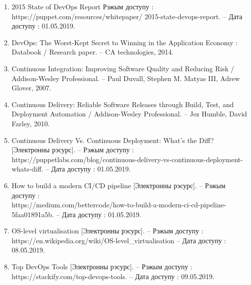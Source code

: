 \begin{enumerate}[{label=\arabic{*}}]
    \item 2015 State of DevOps Report
          Рэжым доступу : https://puppet.com/resources/whitepaper/
          2015-state-devops-report. --
          Дата доступу : 01.05.2019.
        \label{site:puppet.com/resources/whitepaper/2015}

    \item DevOps: The Worst-Kept Secret to Winning
          in the Application Economy : Databook /
          Research paper. --
          CA technologies, 2014.
        \label{article:DevOps:The Worst-Kept Secret}

    \item Continuous Integration:
          Improving Software Quality and Reducing Risk /
          Addison-Wesley Professional. --
          Paul Duvall, Stephen M. Matyas III, Adrew Glover, 2007.
        \label{book:Continuous Integration}

    \item Continuous Delivery: 
          Reliable Software Releases through Build, Test, 
          and Deployment Auto\-mation / 
          Addison-Wesley Professional. -- 
          Jez Humble, David Farley, 2010.
        \label{book:Continuous Delivery}

    \item Continuous Delivery Vs. Continuous Deployment: What's the Diff?
          [Электронны рэсурс].\,\,--
          Рэжым доступу : https://puppetlabs.com/blog/continuous-delivery-vs-continuous-deployment-whats-diff. --
          Дата доступу : 01.05.2019.
        \label{book:Continuous Delivery vs. Continuous Deployment}

    \item How to build a modern CI/CD pipeline
          [Электронны рэсурс]. --
          Рэжым доступу : \\
          https://medium.com/bettercode/how-to-build-a-modern-ci-cd-pipeline-5faa01891a5b. --
          Дата доступу : 01.05.2019.
        \label{site:CI/CD-pipeline}

    \item OS-level virtualisation
          [Электронны рэсурс]. --
          Рэжым доступу : \\
          https://en.wikipedia.org/wiki/OS-level\_virtualisation --
          Дата доступу : 08.05.2019.
        \label{site:OS-level}

    \item Top DevOps Tools
          [Электронны рэсурс]. --
          Рэжым доступу : \\
          https://stackify.com/top-devops-tools. --
          Дата доступу : 09.05.2019.
        \label{site:Top DevOps Tools}
\end{enumerate}
